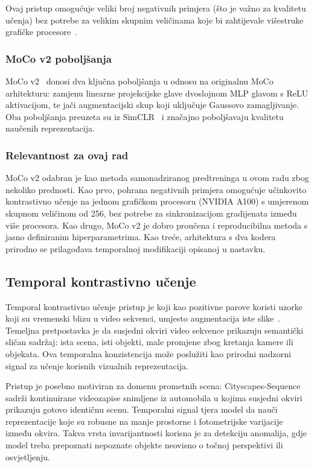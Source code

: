 \documentclass[diplomskirad]{fer}
\begin{document}
Ovaj pristup omogućuje veliki broj negativnih primjera (što je važno za kvalitetu učenja) bez potrebe za velikim skupnim veličinama koje bi zahtijevale višestruke grafičke procesore~\cite{he2020moco}.

\subsubsection{MoCo v2 poboljšanja}

MoCo v2~\cite{chen2020improvedbaselinesmomentumcontrastive} donosi dva ključna poboljšanja u odnosu na originalnu MoCo arhitekturu: zamjenu linearne projekcijske glave dvoslojnom MLP glavom s ReLU aktivacijom, te jači augmentacijski skup koji uključuje Gaussovo zamagljivanje. Oba poboljšanja preuzeta su iz SimCLR~\cite{chen2020simclr} i značajno poboljšavaju kvalitetu naučenih reprezentacija.

\subsubsection{Relevantnost za ovaj rad}

MoCo v2 odabran je kao metoda samonadziranog predtreninga u ovom radu zbog nekoliko prednosti. Kao prvo, pohrana negativnih primjera omogućuje učinkovito kontrastivno učenje na jednom grafičkom procesoru (NVIDIA A100) s umjerenom skupnom veličinom od 256, bez potrebe za sinkronizacijom gradijenata između više procesora. Kao drugo, MoCo v2 je dobro proučena i reproducibilna metoda s jasno definiranim hiperparametrima. Kao treće, arhitektura s dva kodera prirodno se prilagođava temporalnoj modifikaciji opisanoj u nastavku.

\subsection{Temporal kontrastivno učenje}

Temporal kontrastivno učenje pristup je koji kao pozitivne parove koristi uzorke koji su vremenski blizu u video sekvenci, umjesto augmentacija iste slike~\cite{cvrl2021}. Temeljna pretpostavka je da susjedni okviri video sekvence prikazuju semantički sličan sadržaj: ista scena, isti objekti, male promjene zbog kretanja kamere ili objekata. Ova temporalna konzistencija može poslužiti kao prirodni nadzorni signal za učenje korisnih vizualnih reprezentacija.

Pristup je posebno motiviran za domenu prometnih scena: Cityscapes-Sequence sadrži kontinuirane videozapise snimljene iz automobila u kojima susjedni okviri prikazuju gotovo identičnu scenu. Temporalni signal tjera model da nauči reprezentacije koje su robusne na manje prostorne i fotometrijske varijacije između okvira. Takva vrsta invarijantnosti korisna je za detekciju anomalija, gdje model treba prepoznati nepoznate objekte neovisno o točnoj perspektivi ili osvjetljenju.
\end{document}
